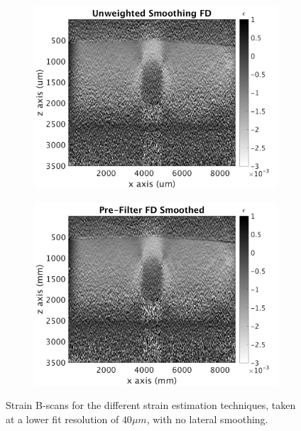 \begin{figure}[h]
\begin{subfigure}{0.49\textwidth}
        \includegraphics[width=\textwidth]{appendix_figs/uwfd_fr40_lr0.png}
    \end{subfigure}
    \begin{subfigure}{0.49\textwidth}
    	\centering
        \includegraphics[width=\textwidth]{appendix_figs/fdsm_fr40_lr0.png}
    \end{subfigure}    
    \label{images_low_fitres}
    \caption{Strain B-scans for the different strain estimation techniques, taken at a lower fit resolution of $40\mu m$, with no lateral smoothing.}
\end{figure}


